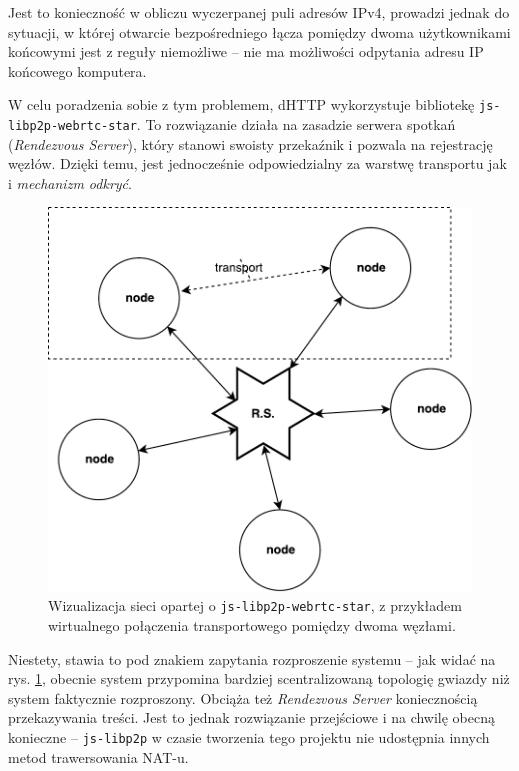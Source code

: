 Jest to konieczność w obliczu wyczerpanej puli adresów IPv4, prowadzi jednak do sytuacji, w której otwarcie bezpośredniego łącza pomiędzy dwoma użytkownikami końcowymi jest z reguły niemożliwe -- nie ma możliwości odpytania adresu IP końcowego komputera.

W celu poradzenia sobie z tym problemem, dHTTP wykorzystuje bibliotekę \texttt{js-libp2p-webrtc-star}. To rozwiązanie działa na zasadzie serwera spotkań ({\em Rendezvous Server}), który stanowi swoisty przekaźnik i pozwala na rejestrację węzłów. Dzięki temu, jest jednocześnie odpowiedzialny za warstwę transportu jak i {\em mechanizm odkryć}.

\begin{figure}[h]
        \centering
        \includegraphics[scale=0.5]{webrtc-star.pdf}
    
        \caption{Wizualizacja sieci opartej o \texttt{js-libp2p-webrtc-star}, z przykładem wirtualnego połączenia transportowego pomiędzy dwoma węzłami.}
        \label{fig:webrtc-star}
\end{figure}

Niestety, stawia to pod znakiem zapytania rozproszenie systemu -- jak widać na rys. \ref{fig:webrtc-star}, obecnie system przypomina bardziej scentralizowaną topologię gwiazdy niż system faktycznie rozproszony. Obciąża też {\em Rendezvous Server} koniecznością przekazywania treści. Jest to jednak rozwiązanie przejściowe i na chwilę obecną konieczne -- \texttt{js-libp2p} w czasie tworzenia tego projektu nie udostępnia innych metod trawersowania NAT-u.

